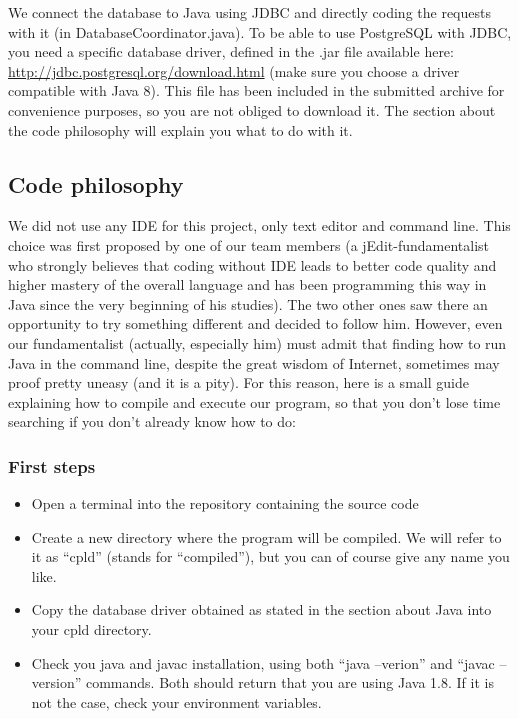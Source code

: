\documentclass[a4paper ,12pt,french]{article}
\begin{document}
We connect the database to Java using JDBC and directly coding the requests with it (in DatabaseCoordinator.java). To be able to use PostgreSQL with JDBC, you need a specific database driver, defined in the .jar file available here: 
\url{http://jdbc.postgresql.org/download.html} (make sure you choose a driver compatible with Java 8). This file has been included in the submitted archive for convenience purposes, so you are not obliged to download it. The section about the code philosophy will explain you what to do with it.

\subsection{Code philosophy}

We did not use any IDE for this project, only text editor and command line. This choice was first proposed by one of our team members (a jEdit-fundamentalist who strongly believes that coding without IDE leads to better code quality and higher mastery of the overall language and has been programming this way in Java since the very beginning of his studies). The two other ones saw there an opportunity to try something different and decided to follow him. 
However, even our fundamentalist (actually, especially him) must admit that finding how to run Java in the command line, despite the great wisdom of Internet, sometimes may proof pretty uneasy (and it is a pity). For this reason, here is a small guide explaining how to compile and execute our program, so that you don’t lose time searching if you don’t already know how to do:

\subsubsection{First steps}

\begin{itemize}
\item Open a terminal into the repository containing the source code
\item Create a new directory where the program will be compiled. We will refer to it as “cpld” (stands for “compiled”), but you can of course give any name you like.
\item Copy the database driver obtained as stated in the section about Java into your cpld directory.
\item Check you java and javac installation, using both “java –verion” and “javac –version” commands. Both should return that you are using Java 1.8. If it is not the case, check your environment variables.

\end{itemize}
\end{document}
